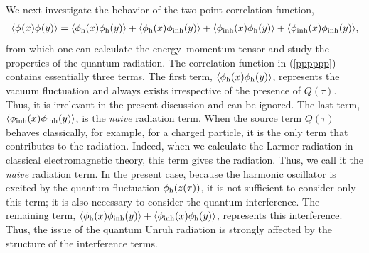 \documentclass[aps,prd,preprintnumbers,nofootinbib,showpacs]{revtex4}%
\begin{document}
\begin{widetext}
We next investigate the behavior of  the two-point correlation function, 
\begin{eqnarray}
\langle\phi_{\rm }(x)\phi_{\rm }(y)\rangle=\langle\phi_{\rm h}(x)\phi_{\rm h}(y)\rangle+
\langle\phi_{\rm h}(x)\phi_{\rm inh}(y)\rangle
+\langle\phi_{\rm inh}(x)\phi_{\rm h}(y)\rangle
+\langle\phi_{\rm inh}(x)\phi_{\rm inh}(y)\rangle,
\label{pppppp}
\end{eqnarray}
from which one can calculate the energy--momentum tensor
and study the properties of the quantum radiation. 
The correlation function in (\ref{pppppp}) contains essentially three terms.
The first term, $\langle\phi_{\rm h}(x)\phi_{\rm h}(y)\rangle$, represents 
the vacuum fluctuation and always exists irrespective of the presence of $Q(\tau)$.
Thus, it is irrelevant in the present discussion and can be ignored.
The last term, $\langle\phi_{\rm inh}(x)\phi_{\rm inh}(y)\rangle$, is the {\it naive} radiation 
term. When the source term $Q(\tau)$ behaves classically, for example, for a charged particle,
it is the only term that contributes to the radiation. Indeed, when we calculate the Larmor radiation
in classical electromagnetic theory, this term gives the radiation. 
Thus, we call it the {\it naive} radiation term. In the present case, because the harmonic oscillator
is excited by the quantum fluctuation $\phi_{\rm h}(z(\tau))$, it is not sufficient to consider
only this term; it is also necessary to consider the quantum interference.
The remaining term, $\langle\phi_{\rm h}(x)\phi_{\rm inh}(y)\rangle
+\langle\phi_{\rm inh}(x)\phi_{\rm h}(y)\rangle$, represents this interference.
Thus, the issue of the quantum Unruh radiation is strongly affected by the structure of the
interference terms.


\end{widetext}
\end{document}
